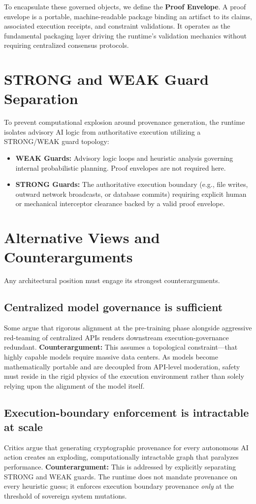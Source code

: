 \documentclass{article}
\begin{document}
To encapsulate these governed objects, we define the \textbf{Proof Envelope}. A proof envelope is a portable, machine-readable package binding an artifact to its claims, associated execution receipts, and constraint validations. It operates as the fundamental packaging layer driving the runtime's validation mechanics without requiring centralized consensus protocols.

\section{STRONG and WEAK Guard Separation}
To prevent computational explosion around provenance generation, the runtime isolates advisory AI logic from authoritative execution utilizing a STRONG/WEAK guard topology:
\begin{itemize}
    \item \textbf{WEAK Guards:} Advisory logic loops and heuristic analysis governing internal probabilistic planning. Proof envelopes are not required here.
    \item \textbf{STRONG Guards:} The authoritative execution boundary (e.g., file writes, outward network broadcasts, or database commits) requiring explicit human or mechanical interceptor clearance backed by a valid proof envelope.
\end{itemize}

\section{Alternative Views and Counterarguments}

Any architectural position must engage its strongest counterarguments. 

\subsection{Centralized model governance is sufficient}
Some argue that rigorous alignment at the pre-training phase alongside aggressive red-teaming of centralized APIs renders downstream execution-governance redundant. \textbf{Counterargument:} This assumes a topological constraint—that highly capable models require massive data centers. As models become mathematically portable and are decoupled from API-level moderation, safety must reside in the rigid physics of the execution environment rather than solely relying upon the alignment of the model itself.

\subsection{Execution-boundary enforcement is intractable at scale}
Critics argue that generating cryptographic provenance for every autonomous AI action creates an exploding, computationally intractable graph that paralyzes performance. \textbf{Counterargument:} This is addressed by explicitly separating STRONG and WEAK guards. The runtime does not mandate provenance on every heuristic guess; it enforces execution boundary provenance \textit{only} at the threshold of sovereign system mutations. 
\end{document}
